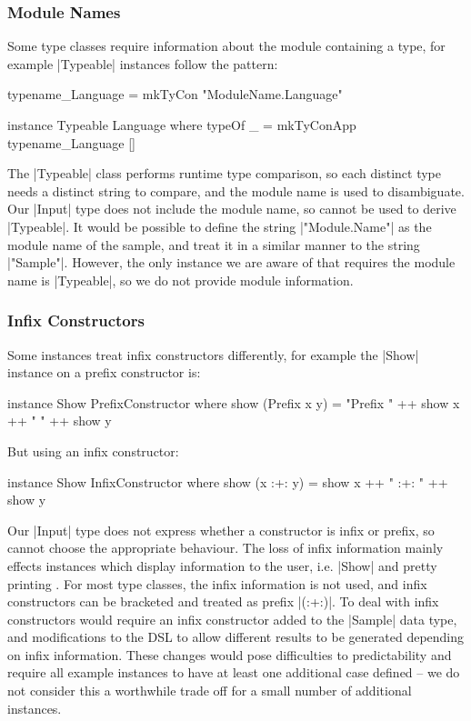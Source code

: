 \documentclass{llncs}
\begin{document}
\subsubsection{Module Names}
\label{sec:failure_typeable}

Some type classes require information about the module containing a type, for example |Typeable| instances \cite{lammel:syb} follow the pattern:

\begin{code}
typename_Language = mkTyCon "ModuleName.Language"

instance Typeable Language where
    typeOf _ = mkTyConApp typename_Language []
\end{code}

The |Typeable| class performs runtime type comparison, so each distinct type needs a distinct string to compare, and the module name is used to disambiguate. Our |Input| type does not include the module name, so cannot be used to derive |Typeable|. It would be possible to define the string |"Module.Name"| as the module name of the sample, and treat it in a similar manner to the string |"Sample"|. However, the only instance we are aware of that requires the module name is |Typeable|, so we do not provide module information.

\subsubsection{Infix Constructors}

Some instances treat infix constructors differently, for example the |Show| instance on a prefix constructor is:

\begin{code}
instance Show PrefixConstructor where
    show (Prefix x y) = "Prefix " ++ show x ++ " " ++ show y
\end{code}

\noindent But using an infix constructor:

\begin{code}
instance Show InfixConstructor where
    show (x :+: y) = show x ++ " :+: " ++ show y
\end{code}

Our |Input| type does not express whether a constructor is infix or prefix, so cannot choose the appropriate behaviour. The loss of infix information mainly effects instances which display information to the user, i.e. |Show| and pretty printing \cite{hughes:pretty_printing}. For most type classes, the infix information is not used, and infix constructors can be bracketed and treated as prefix |(:+:)|. To deal with infix constructors would require an infix constructor added to the |Sample| data type, and modifications to the DSL to allow different results to be generated depending on infix information. These changes would pose difficulties to predictability and require all example instances to have at least one additional case defined -- we do not consider this a worthwhile trade off for a small number of additional instances.
\end{document}
